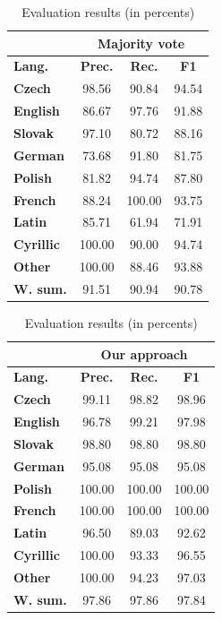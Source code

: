 \documentclass{acm_proc_article-sp}
\begin{document}
{\begin{table}[]
 \centering
 \caption{Evaluation results (in percents)}
 \label{evalres}
 \vspace{0.5cm}
 \begin{tabular}{l||c|c|c|}
       &
     \multicolumn{3}{|c}{\textbf{Majority vote}} \\ \hline
     \textbf{Lang.}    & \textbf{Prec.}  & \textbf{Rec.}   & \textbf{F1}  \\ \hline
     \textbf{Czech}    & 98.56  & 90.84  & 94.54 \\
     \textbf{English}  & 86.67  & 97.76  & 91.88 \\
     \textbf{Slovak}   & 97.10  & 80.72  & 88.16 \\
     \textbf{German}   & 73.68  & 91.80  & 81.75 \\
     \textbf{Polish}   & 81.82  & 94.74  & 87.80 \\
     \textbf{French}   & 88.24  & 100.00 & 93.75 \\ \hline
     \textbf{Latin}    & 85.71  & 61.94  & 71.91 \\
     \textbf{Cyrillic} & 100.00 & 90.00  & 94.74 \\
     \textbf{Other}    & 100.00 & 88.46  & 93.88 \\ \hline \hline
     \textbf{W. sum.}  & 91.51  & 90.94  & 90.78 \\
 \end{tabular}
 \end{table}


 \begin{table}[]
 \centering
 \caption{Evaluation results (in percents)}
 \label{evalres}
 \vspace{0.5cm}
 \begin{tabular}{l||c|c|c|}
       &
     \multicolumn{3}{|c}{\textbf{Our approach}} \\ \hline
     \textbf{Lang.}    & \textbf{Prec.}  & \textbf{Rec.}   & \textbf{F1} \\ \hline
     \textbf{Czech}    & 99.11  & 98.82  & 98.96  \\
     \textbf{English}  & 96.78  & 99.21  & 97.98  \\
     \textbf{Slovak}   & 98.80  & 98.80  & 98.80  \\
     \textbf{German}   & 95.08  & 95.08  & 95.08  \\
     \textbf{Polish}   & 100.00 & 100.00 & 100.00 \\
     \textbf{French}   & 100.00 & 100.00 & 100.00 \\ \hline
     \textbf{Latin}    & 96.50  & 89.03  & 92.62  \\
     \textbf{Cyrillic} & 100.00 & 93.33  & 96.55  \\
     \textbf{Other}    & 100.00 & 94.23  & 97.03  \\ \hline \hline
     \textbf{W. sum.}  & 97.86  & 97.86  & 97.84  \\
 \end{tabular}
 \end{table}

}
\end{document}
